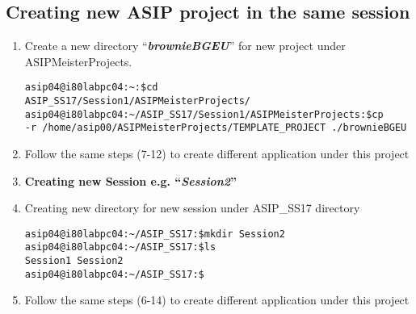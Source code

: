 \subsection{Creating new ASIP project in the same session}
\begin{enumerate}[resume]
	\item Create a new directory ``\emph{\textbf{brownieBGEU}}'' for new project
	under ASIPMeisterProjects.
\begin{lstlisting}
asip04@i80labpc04:~:$cd
ASIP_SS17/Session1/ASIPMeisterProjects/
asip04@i80labpc04:~/ASIP_SS17/Session1/ASIPMeisterProjects:$cp
-r /home/asip00/ASIPMeisterProjects/TEMPLATE_PROJECT ./brownieBGEU
\end{lstlisting}
	\item Follow the same steps (7-12) to create different application under
	this project
	\item \textbf{Creating new Session e.g. ``\emph{Session2}''}
	\item Creating new directory for new session under ASIP\_SS17 directory
\begin{lstlisting}
asip04@i80labpc04:~/ASIP_SS17:$mkdir Session2
asip04@i80labpc04:~/ASIP_SS17:$ls
Session1 Session2
asip04@i80labpc04:~/ASIP_SS17:$
\end{lstlisting}
	\item Follow the same steps (6-14) to create different application under
	this project
\end{enumerate}